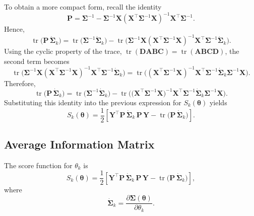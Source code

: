 \documentclass[
  letterpaper,
  DIV=11,
  numbers=noendperiod]{scrartcl}
\begin{document}
To obtain a more compact form, recall the identity \begin{equation}
\symbf{P}
=
\symbf{\Sigma}^{-1}
-
\symbf{\Sigma}^{-1}\symbf{X}
\left(
\symbf{X}^\top \symbf{\Sigma}^{-1}\symbf{X}
\right)^{-1}
\symbf{X}^\top \symbf{\Sigma}^{-1}.
\end{equation} Hence, \begin{equation}
\operatorname{tr}\!\big(\symbf{P}\,\dot{\symbf{\Sigma}}_k\big)
=
\operatorname{tr}\!\big(\symbf{\Sigma}^{-1}\dot{\symbf{\Sigma}}_k\big)
-
\operatorname{tr}\!\Big(
\symbf{\Sigma}^{-1}\symbf{X}
\left(
\symbf{X}^\top \symbf{\Sigma}^{-1}\symbf{X}
\right)^{-1}
\symbf{X}^\top \symbf{\Sigma}^{-1}
\dot{\symbf{\Sigma}}_k
\Big).
\end{equation} Using the cyclic property of the trace,
\(\operatorname{tr}(\symbf{D}\symbf{A}\symbf{B}\symbf{C})
=
\operatorname{tr}(\symbf{A}\symbf{B}\symbf{C}\symbf{D})\), the second
term becomes \begin{equation}
\operatorname{tr}\!\Big(
\symbf{\Sigma}^{-1}\symbf{X}
\left(
\symbf{X}^\top \symbf{\Sigma}^{-1}\symbf{X}
\right)^{-1}
\symbf{X}^\top \symbf{\Sigma}^{-1}
\dot{\symbf{\Sigma}}_k
\Big)
=
\operatorname{tr}\!\Big(
\left(
\symbf{X}^\top \symbf{\Sigma}^{-1}\symbf{X}
\right)^{-1}
\symbf{X}^\top \symbf{\Sigma}^{-1}
\dot{\symbf{\Sigma}}_k
\symbf{\Sigma}^{-1}\symbf{X}
\Big).
\end{equation} Therefore, \begin{equation}
\operatorname{tr}\!\big(\symbf{P}\,\dot{\symbf{\Sigma}}_k\big)
=
\operatorname{tr}\!\big(\symbf{\Sigma}^{-1}\dot{\symbf{\Sigma}}_k\big)
-
\operatorname{tr}\!\Big(
\big(\symbf{X}^\top \symbf{\Sigma}^{-1}\symbf{X}\big)^{-1}
\symbf{X}^\top \symbf{\Sigma}^{-1}
\dot{\symbf{\Sigma}}_k
\symbf{\Sigma}^{-1}\symbf{X}
\Big).
\end{equation} Substituting this identity into the previous expression
for \(S_k(\symbf{\theta})\) yields \begin{equation}
\label{eq-score}
\boxed{
S_k(\symbf{\theta})
=
\frac{1}{2}
\left[
\symbf{Y}^\top \symbf{P}\,\dot{\symbf{\Sigma}}_k\,\symbf{P}\,\symbf{Y}
-
\operatorname{tr}\!\big(\symbf{P}\,\dot{\symbf{\Sigma}}_k\big)
\right]
}.
\end{equation}

\subsection{Average Information
Matrix}\label{average-information-matrix}

The score function for \(\theta_k\) is \begin{equation}
S_k(\symbf{\theta})
=
\frac{1}{2}
\left[
\symbf{Y}^\top \symbf{P}\,\dot{\symbf{\Sigma}}_k\,\symbf{P}\,\symbf{Y}
-
\operatorname{tr}\!\big(\symbf{P}\,\dot{\symbf{\Sigma}}_k\big)
\right],
\end{equation} where \begin{equation}
\dot{\symbf{\Sigma}}_k
=
\frac{\partial \symbf{\Sigma}(\symbf{\theta})}{\partial \theta_k}.
\end{equation}
\end{document}
